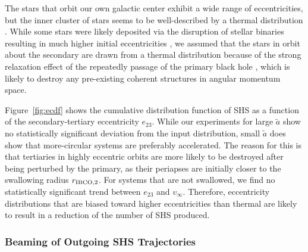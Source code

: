 \documentclass[a4paper,twocolumn]{emulateapj}
\begin{document}
{The stars that orbit our own galactic center exhibit a wide range of eccentricities, but the inner cluster of stars seems to be well-described by a thermal distribution \citep{Gillessen:2009b}. While some stars were likely deposited via the disruption of stellar binaries resulting in much higher initial eccentricities \citep{Madigan:2011a}, we assumed that the stars in orbit about the secondary are drawn from a thermal distribution because of the strong relaxation effect of the repeatedly passage of the primary black hole \citep{Perets:2007a}, which is likely to destroy any pre-existing coherent structures in angular momentum space.

Figure~\ref{fig:ecdf} shows the cumulative distribution function of SHS as a function of the secondary-tertiary eccentricity $e_{23}$. While our experiments for large $\tilde{a}$ show no statistically significant deviation from the input distribution, small $\tilde{a}$ does show that more-circular systems are preferably accelerated. The reason for this is that tertiaries in highly eccentric orbits are more likely to be destroyed after being perturbed by the primary, as their periapses are initially closer to the swallowing radius $r_{\rm IBCO,2}$. For systems that are not swallowed, we find no statistically significant trend between $e_{23}$ and $v_{\infty}$. Therefore, eccentricity distributions that are biased toward higher eccentricities than thermal are likely to result in a reduction of the number of SHS produced.

\subsubsection{Beaming of Outgoing SHS Trajectories}\label{sec:beaming}

}
\end{document}
